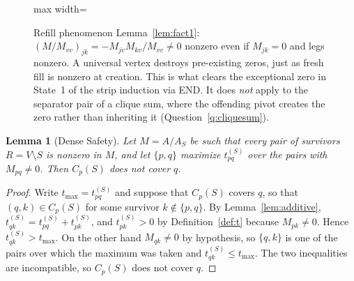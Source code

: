 \documentclass[11pt]{article}
\theoremstyle{plain}
\newtheorem{lemma}[theorem]{Lemma}
\theoremstyle{definition}
\begin{document}
\begin{aiblock}
\begin{figure}[H]
\centering
\begin{adjustbox}{max width=\textwidth}
\end{adjustbox}
\caption[The refill phenomenon]{Refill phenomenon Lemma~\ref{lem:fact1}: $(M/M_{vv})_{jk}=-M_{jv}M_{kv}/M_{vv}\neq0$ nonzero even if $M_{jk}=0$ and legs nonzero. A universal vertex destroys pre-existing zeros, just as fresh fill is nonzero at creation. This is
what clears the exceptional zero in State~1 of the strip induction via END. It does \emph{not} apply
to the separator pair of a clique sum, where the offending pivot creates the zero rather than
inheriting it (Question~\ref{q:cliquesum}).}
\label{fig:refill}
\end{figure}


\begin{lemma}[Dense Safety]\label{lem:dense}
Let $M=A/A_S$ be such that every pair of survivors $R=V\setminus S$ is nonzero in $M$, and let
$\{p,q\}$ maximize $t^{(S)}_{pq}$ over the pairs with $M_{pq}\neq0$. Then $C_p(S)$ does not cover $q$.
\end{lemma}

\begin{proof}
Write $t_{\max}=t^{(S)}_{pq}$ and suppose that $C_p(S)$ covers $q$, so that $(q,k)\in C_p(S)$ for some
survivor $k\notin\{p,q\}$. By Lemma~\ref{lem:additive},
$t^{(S)}_{qk}=t^{(S)}_{pq}+t^{(S)}_{pk}$, and $t^{(S)}_{pk}>0$ by Definition~\ref{def:t} because
$M_{pk}\neq0$. Hence $t^{(S)}_{qk}>t_{\max}$. On the other hand $M_{qk}\neq0$ by hypothesis, so
$\{q,k\}$ is one of the pairs over which the maximum was taken and $t^{(S)}_{qk}\le t_{\max}$. The two
inequalities are incompatible, so $C_p(S)$ does not cover $q$.
\end{proof}


\end{aiblock}
\end{document}
